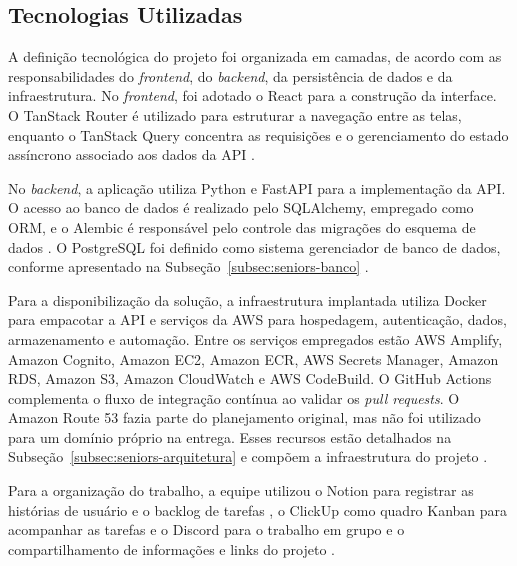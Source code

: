 \subsection{Tecnologias Utilizadas}
A definição tecnológica do projeto foi organizada em camadas, de acordo com as
responsabilidades do \textit{frontend}, do \textit{backend}, da persistência de
dados e da infraestrutura. No \textit{frontend}, foi adotado o React para a
construção da interface. O TanStack Router é utilizado para estruturar a navegação
entre as telas, enquanto o TanStack Query concentra as requisições e o
gerenciamento do estado assíncrono associado aos dados da API
\cite{react,tanstack-router,tanstack-query}.

No \textit{backend}, a aplicação utiliza Python e FastAPI para a implementação da
API. O acesso ao banco de dados é realizado pelo SQLAlchemy, empregado como ORM,
e o Alembic é responsável pelo controle das migrações do esquema de dados
\cite{python,fastapi,sqlalchemy,alembic}. O PostgreSQL foi definido como sistema
gerenciador de banco de dados, conforme apresentado na Subseção~\ref{subsec:seniors-banco}
\cite{postgresql}.

Para a disponibilização da solução, a infraestrutura implantada utiliza Docker
para empacotar a API e serviços da AWS para hospedagem, autenticação, dados,
armazenamento e automação. Entre os serviços empregados estão AWS Amplify, Amazon
Cognito, Amazon EC2, Amazon ECR, AWS Secrets Manager, Amazon RDS, Amazon S3,
Amazon CloudWatch e AWS CodeBuild. O GitHub Actions complementa o fluxo de
integração contínua ao validar os \textit{pull requests}. O Amazon Route 53 fazia
parte do planejamento original, mas não foi utilizado para um domínio próprio na
entrega. Esses recursos estão detalhados na Subseção~\ref{subsec:seniors-arquitetura} e compõem a
infraestrutura do projeto \cite{docker,aws-docs,github-actions}.

Para a organização do trabalho, a equipe utilizou o Notion para registrar as
histórias de usuário e o backlog de tarefas \cite{notion-projects-tasks}, o
ClickUp como quadro Kanban para acompanhar as tarefas \cite{clickup-kanban} e
o Discord para o trabalho em grupo e o compartilhamento de informações e links
do projeto \cite{discord-server-guide}.
